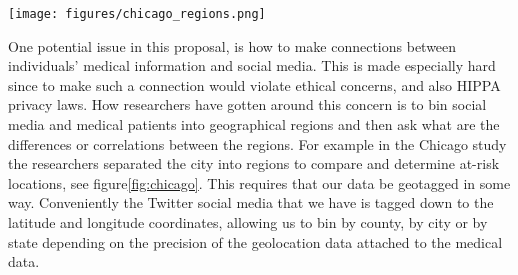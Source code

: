 \begin{figure*}
\centering
\texttt{[image: figures/chicago\_regions.png]}
\caption{Regions of Chicago from \cite{morgan2017hiv}.}
\label{fig:chicago}
\end{figure*}

One potential issue in this proposal, is how to make connections between individuals' medical information and social media. This is made especially hard since to make such a connection would violate ethical concerns, and also HIPPA privacy laws. How researchers have gotten around this concern is to bin social media and medical patients into geographical regions and then ask what are the differences or correlations between the regions. For example in the Chicago study\cite{morgan2017hiv} the researchers separated the city into regions to compare and determine at-risk locations, see figure\ref{fig:chicago}. This requires that our data be geotagged in some way. Conveniently the Twitter social media that we have is tagged down to the latitude and longitude coordinates, allowing us to bin by county, by city or by state depending on the precision of the geolocation data attached to the medical data.










